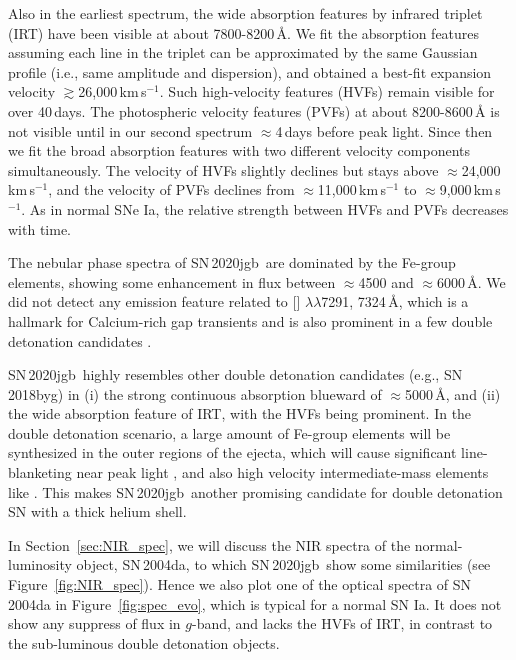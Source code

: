 \documentclass[twocolumn]{aastex631}
\newcommand{\sn}{SN\,2020jgb}
\begin{document}
Also in the earliest spectrum, the wide absorption features by  infrared triplet (IRT) have been visible at about 7800-8200\,\r{A}. We fit the absorption features assuming each line in the triplet can be approximated by the same Gaussian profile (i.e., same amplitude and dispersion), and obtained a best-fit expansion velocity $\gtrsim$26,000\,km\,s$^{-1}$. Such high-velocity features (HVFs) remain visible for over 40\,days. The photospheric velocity features (PVFs) at about 8200-8600\,\r{A} is not visible until in our second spectrum $\approx$4\,days before peak light. Since then we fit the broad absorption features with two different velocity components simultaneously. The velocity of HVFs slightly declines but stays above $\approx$24,000\,km\,s$^{-1}$, and the velocity of PVFs declines from $\approx$11,000\,km\,s$^{-1}$ to $\approx$9,000\,km\,s$^{-1}$. As in normal SNe Ia, the relative strength between HVFs and PVFs decreases with time.

The nebular phase spectra of \sn\ are dominated by the Fe-group elements, showing some enhancement in flux between $\approx$4500 and $\approx$6000\,\r{A}. We did not detect any emission feature related to [] $\lambda\lambda$7291, 7324\,\r{A}, which is a hallmark for Calcium-rich gap transients and is also prominent in a few double detonation candidates \citep[e.g., SN\,2016hnk and SN\,2019ofm;][]{De_Ca-rich_2020}. 

\sn\ highly resembles other double detonation candidates (e.g., SN\,2018byg) in (i) the strong continuous absorption blueward of $\approx$5000\,\r{A}, and (ii) the wide absorption feature of  IRT, with the HVFs being prominent. In the double detonation scenario, a large amount of Fe-group elements will be synthesized in the outer regions of the ejecta, which will cause significant line-blanketing near peak light \citep{Kromer_DD_2010, polin_observational_2019}, and also high velocity intermediate-mass elements like  \citep{Fink_DD_2010, Kromer_DD_2010}. This makes \sn\ another promising candidate for double detonation SN with a thick helium shell.

In Section~\ref{sec:NIR_spec}, we will discuss the NIR spectra of the normal-luminosity object, SN\,2004da, to which \sn\ show some similarities (see Figure~\ref{fig:NIR_spec}). Hence we also plot one of the optical spectra of SN\,2004da in Figure~\ref{fig:spec_evo}, which is typical for a normal SN Ia. It does not show any suppress of flux in $g$-band, and lacks the HVFs of  IRT, in contrast to the sub-luminous double detonation objects.
\end{document}

